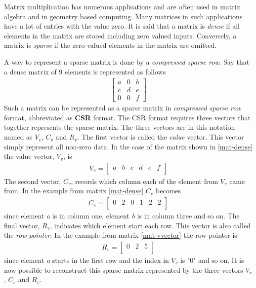 Matrix multiplication has numerous applications and are often used in matrix algebra and in geometry based computing.
Many matrices in such applications have a lot of entries with the value zero.
It is said that a matrix is \textit{dense} if all elements in the matrix are stored including zero valued inputs.
Conversely, a matrix is \textit{sparse} if the zero valued elements in the matrix are omitted.

A way to represent a sparse matrix is done by a \textit{compressed sparse row}.
Say that a dense matrix of 9 elements is represented as follows
\begin{gather}
	\begin{bmatrix}
		a & 0 & b \\[0.3em]
		c & d & e \\[0.3em]
		0 & 0 & f
	\end{bmatrix}
	\label{mat-dense}
\end{gather}
Such a matrix can be represented as a sparse matrix in \textit{compressed sparse row} format, abbreviated as \textbf{CSR} format.
The CSR format requires three vectors that together represents the sparse matrix.
The three vectors are in this notation named as $V_v$, $C_v$ and $R_v$.
The first vector is called the \textit{value} vector.
This vector simply represent all non-zero data.
In the case of the matrix shown in \ref{mat-dense} the value vector, $V_v$, is
\begin{gather}
	V_v =
	\begin{bmatrix}
		a & b & c & d & e & f\\[0.3em]
	\end{bmatrix}
\end{gather}
The second vector, $C_v$, records which column each of the element from $V_v$ came from.
In the example from matrix \ref{mat-dense} $C_v$ becomes
\begin{gather}
	C_v =
	\begin{bmatrix}
		0 & 2 & 0 & 1 & 2 & 2\\[0.3em]
	\end{bmatrix}
	\label{mat-vvector}
\end{gather}
since element \textit{a} is in column one, element \textit{b} is in column three and so on.
The final vector, $R_v$, indicates which element start each row.
This vector is also called the \textit{row-pointer}.
In the example from matrix \ref{mat-vvector} the row-pointer is
\begin{gather}
	R_v =
	\begin{bmatrix}
		0 & 2 & 5\\[0.3em]
	\end{bmatrix}
\end{gather}
since element \textit{a} starts in the first row and the index in $V_v$ is "0" and so on.
It is now possible to reconstruct this sparse matrix represented by the three vectors $V_v$, $C_v$ and $R_v$.

